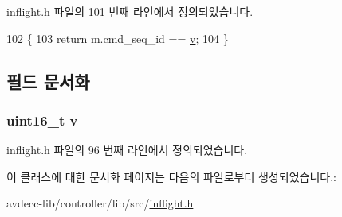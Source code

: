 inflight.\+h 파일의 101 번째 라인에서 정의되었습니다.


\begin{DoxyCode}
102     \{
103         \textcolor{keywordflow}{return} m.cmd\_seq\_id == \hyperlink{classavdecc__lib_1_1_seq_id_comp_ac5f38113a34f9eab3e7782eade81d266}{v};
104     \}
\end{DoxyCode}


\subsection{필드 문서화}
\subsubsection[{\texorpdfstring{v}{v}}]{\setlength{\rightskip}{0pt plus 5cm}uint16\+\_\+t v\hspace{0.3cm}{\ttfamily [private]}}\hypertarget{classavdecc__lib_1_1_seq_id_comp_ac5f38113a34f9eab3e7782eade81d266}{}\label{classavdecc__lib_1_1_seq_id_comp_ac5f38113a34f9eab3e7782eade81d266}


inflight.\+h 파일의 96 번째 라인에서 정의되었습니다.



이 클래스에 대한 문서화 페이지는 다음의 파일로부터 생성되었습니다.\+:\begin{DoxyCompactItemize}
\item 
avdecc-\/lib/controller/lib/src/\hyperlink{inflight_8h}{inflight.\+h}\end{DoxyCompactItemize}
